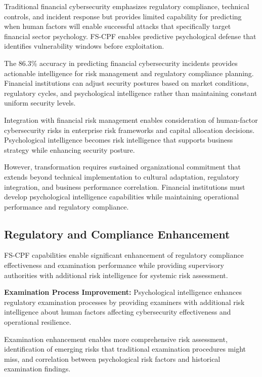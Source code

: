 \documentclass[10pt, twocolumn]{article}
\begin{document}
Traditional financial cybersecurity emphasizes regulatory compliance, technical controls, and incident response but provides limited capability for predicting when human factors will enable successful attacks that specifically target financial sector psychology. FS-CPF enables predictive psychological defense that identifies vulnerability windows before exploitation.

The 86.3\% accuracy in predicting financial cybersecurity incidents provides actionable intelligence for risk management and regulatory compliance planning. Financial institutions can adjust security postures based on market conditions, regulatory cycles, and psychological intelligence rather than maintaining constant uniform security levels.

Integration with financial risk management enables consideration of human-factor cybersecurity risks in enterprise risk frameworks and capital allocation decisions. Psychological intelligence becomes risk intelligence that supports business strategy while enhancing security posture.

However, transformation requires sustained organizational commitment that extends beyond technical implementation to cultural adaptation, regulatory integration, and business performance correlation. Financial institutions must develop psychological intelligence capabilities while maintaining operational performance and regulatory compliance.

\subsection{Regulatory and Compliance Enhancement}

FS-CPF capabilities enable significant enhancement of regulatory compliance effectiveness and examination performance while providing supervisory authorities with additional risk intelligence for systemic risk assessment.

\textbf{Examination Process Improvement:} Psychological intelligence enhances regulatory examination processes by providing examiners with additional risk intelligence about human factors affecting cybersecurity effectiveness and operational resilience.

Examination enhancement enables more comprehensive risk assessment, identification of emerging risks that traditional examination procedures might miss, and correlation between psychological risk factors and historical examination findings.
\end{document}
